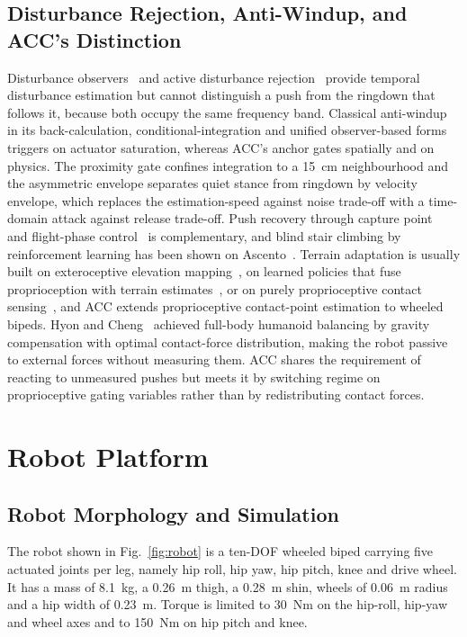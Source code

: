 \documentclass[a4paper,fleqn]{cas-dc}
\begin{document}
\subsection{Disturbance Rejection, Anti-Windup, and ACC's Distinction}
Disturbance observers~\cite{ohnishi1993dob,chen2000dob} and active disturbance
rejection~\cite{han2009adrc,feng2023lqradrc} provide temporal disturbance
estimation but cannot distinguish a push from the ringdown that follows it,
because both occupy the same frequency band. Classical anti-windup in its
back-calculation, conditional-integration and unified observer-based
forms~\cite{astrom1989windup,kothare1994antiwindup,tarbouriech2009aw} triggers on
actuator saturation, whereas ACC's anchor gates spatially and on physics. The
proximity gate confines integration to a \SI{15}{cm} neighbourhood and the
asymmetric envelope separates quiet stance from ringdown by velocity envelope,
which replaces the estimation-speed against noise trade-off with a time-domain
attack against release trade-off. Push recovery through capture
point~\cite{englsberger2015dcm,pratt2006capturepoint} and flight-phase
control~\cite{roscia2023flight} is complementary, and blind stair climbing by
reinforcement learning has been shown on Ascento~\cite{chamorro2024stairclimbing}.
Terrain adaptation is usually built on exteroceptive elevation
mapping~\cite{legged_terrain_extero,fankhauser2018rough}, on learned policies
that fuse proprioception with terrain
estimates~\cite{lee2020challenging,miki2022perceptive}, or on purely
proprioceptive contact
sensing~\cite{blind_terrain_proprio,bellicoso2016terrain,camurri2017contact},
and ACC extends proprioceptive contact-point estimation to wheeled bipeds.
Hyon and Cheng~\cite{hyon2007gated} achieved full-body humanoid balancing by
gravity compensation with optimal contact-force distribution, making the robot
passive to external forces without measuring them. ACC shares the requirement of
reacting to unmeasured pushes but meets it by switching regime on proprioceptive
gating variables rather than by redistributing contact forces.

\section{Robot Platform}
\label{sec:platform}

\subsection{Robot Morphology and Simulation}
The robot shown in Fig.~\ref{fig:robot} is a ten-DOF wheeled biped carrying five
actuated joints per leg, namely hip roll, hip yaw, hip pitch, knee and drive
wheel. It has a mass of \SI{8.1}{kg}, a \SI{0.26}{m} thigh, a \SI{0.28}{m}
shin, wheels of \SI{0.06}{m} radius and a hip width of \SI{0.23}{m}. Torque is
limited to \SI{30}{Nm} on the hip-roll, hip-yaw and wheel axes and to
\SI{150}{Nm} on hip pitch and knee.
\end{document}
